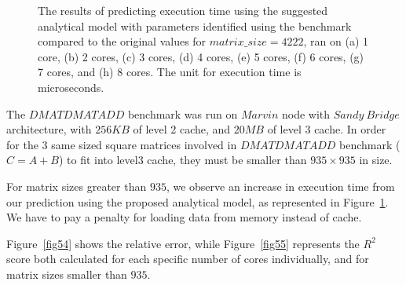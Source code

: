 \begin{figure}[H]
{		\label{fig53:g}}
	\caption{The results of predicting execution time using the suggested analytical model with parameters identified using the benchmark compared to the original values for $matrix\_{size}=4222$, ran on (a) 1 core, (b) 2 cores, (c) 3 cores, (d) 4 cores, (e) 5 cores, (f) 6 cores, (g) 7 cores, and (h) 8 cores. The unit for execution time is microseconds.}
	\label{fig53}	
\end{figure}

The $DMATDMATADD$ benchmark was run on $Marvin$ node with $Sandy\:Bridge$ architecture, with $256KB$ of level 2 cache, and $20MB$ of level 3 cache. In order for the $3$ same sized square matrices involved in $DMATDMATADD$ benchmark ($C=A+B$) to fit into level3 cache, they must be smaller than $935\times{935}$ in size. 

For matrix sizes greater than $935$, we observe an increase in execution time from our prediction using the proposed analytical model, as represented in Figure~\ref{fig53}. We have to pay a penalty for loading data from memory instead of cache.

Figure~\ref{fig54} shows the relative error, while Figure~\ref{fig55} represents the $R^2$ score both calculated for each specific number of cores individually, and for matrix sizes smaller than $935$.


